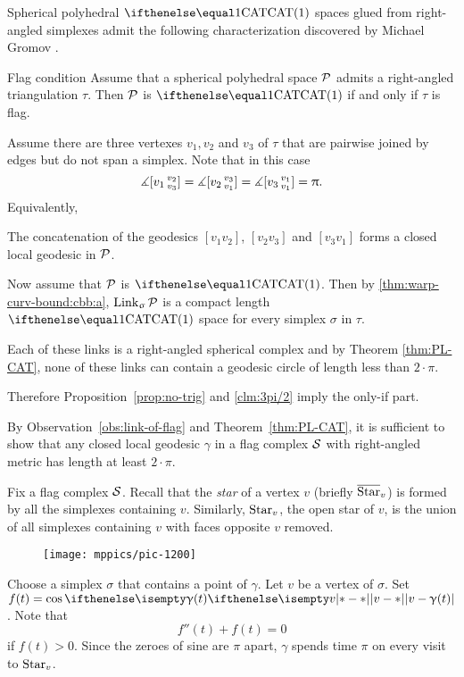 Spherical polyhedral $\CAT1$ spaces glued from right-angled simplexes
admit the following characterization 
discovered by Michael Gromov \cite[p. 122]{gromov:hyp-groups}.

\begin{thm}{Flag condition}\label{thm:flag}
Assume that a spherical polyhedral space $\mathcal{P}$
admits a right-angled triangulation $\tau$.
Then $\mathcal{P}$ is $\CAT1$
if and only if $\tau$ is flag.
\end{thm}

Assume there are three vertexes $v_1,v_2$ and $v_3$ of $\tau$
that are pairwise joined by edges 
but do not span a simplex.
Note that in this case 
$$\measuredangle[v_1\,{}^{v_2}_{v_3}]=\measuredangle[v_2\,{}^{v_3}_{v_1}]=\measuredangle[v_3\,{}^{v_1}_{v_1}]=\uppi.$$
Equivalently,
\begin{clm}{}\label{clm:3pi/2}
The concatenation of the geodesics $[v_1v_2]$, $[v_2v_3]$ and $[v_3v_1]$
forms a closed local geodesic in $\mathcal{P}$. 
\end{clm}

Now assume that $\mathcal{P}$ is $\CAT1$.
Then by \ref{thm:warp-curv-bound:cbb:a},
$\mathop{\rm Link}\nolimits_\upsigma\mathcal{P}$ is a compact length $\CAT1$ space for every simplex $\sigma$ 
in $\tau$. 

Each of these links is a right-angled spherical complex
and
by Theorem \ref{thm:PL-CAT}, 
none
of these links can contain a geodesic circle of length less than $2\cdot\pi$. 

Therefore Proposition~\ref{prop:no-trig} and \ref{clm:3pi/2} 
imply the only-if part.

By Observation~\ref{obs:link-of-flag} and Theorem~\ref{thm:PL-CAT},
it is sufficient to show that any closed local geodesic $\gamma$ 
in a flag complex $\mathcal{S}$ with right-angled metric has length at least $2\cdot\pi$.

Fix a flag complex $\mathcal{S}$.
Recall that the  \emph{star} of a vertex $v$ (briefly $\overline {\mathop{\rm Star}\nolimits}_v$)
is formed by all the simplexes  containing $v$. Similarly, $\mathop{\rm Star}\nolimits_v$,   the open star of $v$, is the union of all simplexes containing $v$ with faces opposite $v$ removed.

\begin{wrapfigure}{o}{45mm}
\vskip-0mm
\centering
\texttt{[image: mppics/pic-1200]}
\end{wrapfigure}

Choose a simplex $\sigma$ that contains a point of $\gamma$.
Let $v$ be a vertex of $\sigma$.
Set $f(t)=\cos\dist{v}{\gamma(t)}{}$.
Note that 
\[f''(t)+f(t)=0\] if $f(t)>0$.  
Since the zeroes of sine are $\pi$ apart,
$\gamma$ 
spends time $\pi$ on every visit to $\mathop{\rm Star}\nolimits_v$.

